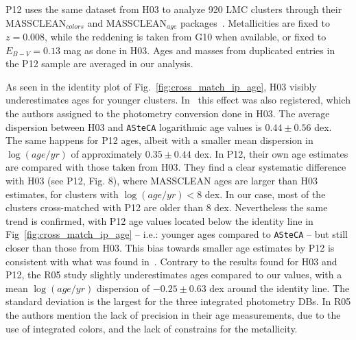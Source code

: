 \documentclass[draft]{aa}
\begin{document}
P12 uses the same dataset from H03 to analyze 920 LMC clusters through their
MASSCLEAN$_{colors}$ and MASSCLEAN$_{age}$
packages~\citep{Popescu_2010a,Popescu_2010b}. Metallicities are fixed to
$z{=0}.008$, while the reddening is taken from G10 when available, or fixed to
$E_{B-V}{=}0.13$ mag as done in H03. Ages and masses from duplicated entries in
the P12 sample are averaged in our analysis.


As seen in the identity plot of Fig.~\ref{fig:cross_match_ip_age}, H03
visibly underestimates ages for younger clusters.
In~\citet[][see Fig. 1]{de_Grijs_2006} this effect was also registered, which
the authors assigned to the photometry conversion done in H03. The average
dispersion between H03 and \texttt{ASteCA} logarithmic age values is
$0.44{\pm}0.56$ dex.
%
The same happens for P12 ages, albeit with a smaller mean dispersion in
$\log(age/yr)$ of approximately $0.35{\pm}0.44$ dex.
In P12, their own age estimates are compared with those taken from H03.
They find a clear systematic difference with H03 (see P12, Fig. 8),
where MASSCLEAN ages are larger than H03 estimates, for clusters with
$\log(age/yr){<}8$ dex. In our case, most of the clusters cross-matched with P12 are
older than 8 dex. Nevertheless the same trend is confirmed, with P12 age values
located below the identity line in Fig~\ref{fig:cross_match_ip_age} -- i.e.:
younger ages compared to \texttt{ASteCA} -- but still closer than those from
H03. This bias towards smaller age estimates by P12 is consistent with what was
found in~\cite{Choudhury_2015}.
%
Contrary to the results found for H03 and P12, the R05 study slightly
underestimates ages compared to our values, with a mean $\log(age/yr)$
dispersion of $-0.25{\pm}0.63$ dex around the identity line. The standard
deviation is the largest for the three integrated photometry DBs. In R05 the
authors mention the lack of precision in their age measurements, due to the use
of integrated colors, and the lack of constrains for the metallicity.
\end{document}
